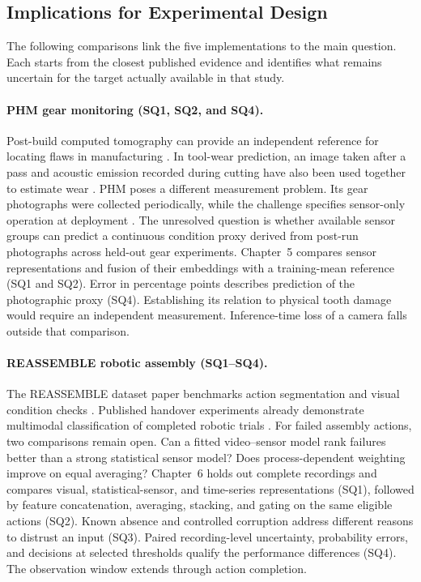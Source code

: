 \subsection{Implications for Experimental Design}
\label{sec:literature-study-gaps}
The following comparisons link the five implementations to the main question. Each starts from the closest published evidence and identifies what remains uncertain for the target actually available in that study.

\paragraph{PHM gear monitoring (SQ1, SQ2, and SQ4).}
Post-build computed tomography can provide an independent reference for locating flaws in manufacturing \citep{Petrich2021Multimodal}. In tool-wear prediction, an image taken after a pass and acoustic emission recorded during cutting have also been used together to estimate wear \citep[PDF pp.~19--24]{P045}. PHM poses a different measurement problem. Its gear photographs were collected periodically, while the challenge specifies sensor-only operation at deployment \citep{PHM2026Challenge}. The unresolved question is whether available sensor groups can predict a continuous condition proxy derived from post-run photographs across held-out gear experiments. Chapter~5 compares sensor representations and fusion of their embeddings with a training-mean reference (SQ1 and SQ2). Error in percentage points describes prediction of the photographic proxy (SQ4). Establishing its relation to physical tooth damage would require an independent measurement. Inference-time loss of a camera falls outside that comparison.

\paragraph{REASSEMBLE robotic assembly (SQ1--SQ4).}
The REASSEMBLE dataset paper benchmarks action segmentation and visual condition checks \citep[PDF pp.~10--13]{Sliwowski2025REASSEMBLE}. Published handover experiments already demonstrate multimodal classification of completed robotic trials \citep[Table~III]{Thoduka2024Handover}. For failed assembly actions, two comparisons remain open. Can a fitted video--sensor model rank failures better than a strong statistical sensor model? Does process-dependent weighting improve on equal averaging? Chapter~6 holds out complete recordings and compares visual, statistical-sensor, and time-series representations (SQ1), followed by feature concatenation, averaging, stacking, and gating on the same eligible actions (SQ2). Known absence and controlled corruption address different reasons to distrust an input (SQ3). Paired recording-level uncertainty, probability errors, and decisions at selected thresholds qualify the performance differences (SQ4). The observation window extends through action completion.

